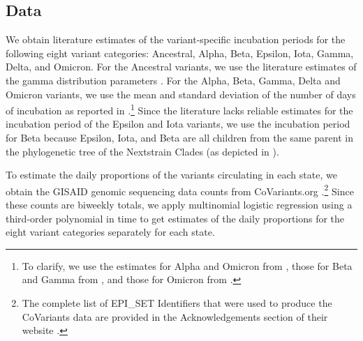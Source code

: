 \documentclass{article}
\begin{document}

\subsection{Data} 

We obtain literature estimates of the variant-specific incubation periods
for the following eight variant categories: Ancestral, Alpha, Beta, Epsilon, Iota, 
Gamma, Delta, and Omicron.
For the Ancestral variants, we use the
literature estimates of the gamma distribution parameters \citep{tindale2020evidence}. 
For the Alpha, Beta, Gamma, Delta and Omicron variants, we use the
mean and standard deviation of the number of days of incubation as reported in
\citet{tanaka2022shorter, grant2022impact, ogata2022shorter}.\footnote{To clarify, 
we use the estimates for Alpha and Omicron from \citet{tanaka2022shorter}, those for
Beta and Gamma from \citet{grant2022impact}, and those for Omicron from
\citet{ogata2022shorter}.} Since the literature lacks reliable estimates for the incubation
period of the Epsilon and Iota variants, we use the
incubation period for Beta because Epsilon, Iota, and Beta are all
children from the same parent in the phylogenetic tree of the Nextstrain Clades
(as depicted in \citealp{hodcroft2021covariants}). 

To estimate the daily proportions of the variants circulating in each state, we
obtain the GISAID genomic sequencing data counts from CoVariants.org
\citep{hodcroft2021covariants, elbe2017data}.\footnote{The complete list of
EPI\_SET Identifiers that were used to produce the CoVariants data are provided
in the Acknowledgements section of their website
\citep{hodcroft2021covariants}.} Since these counts are biweekly totals, we apply
multinomial logistic regression using a third-order polynomial in time to get 
estimates of the daily proportions for the eight variant categories separately for each state.
\end{document}
